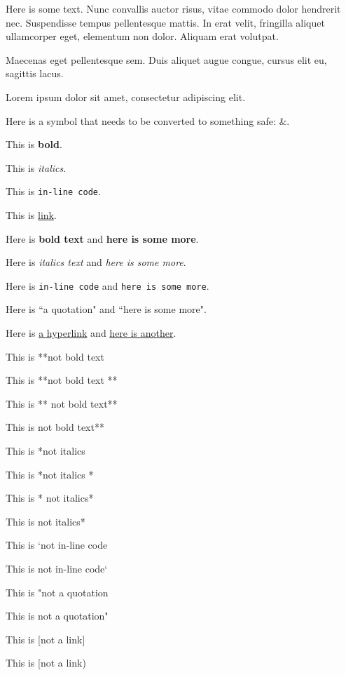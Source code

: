 \documentclass[10pt]{extarticle}
\date{}
\begin{document}

Here is some text. Nunc convallis auctor risus, vitae commodo dolor hendrerit nec. Suspendisse tempus pellentesque mattis. In erat velit, fringilla aliquet ullamcorper eget, elementum non dolor. Aliquam erat volutpat.

Maecenas eget pellentesque sem. Duis aliquet augue congue, cursus elit eu, sagittis lacus. 

Lorem ipsum dolor sit amet, consectetur adipiscing elit.

\medskip

Here is a symbol that needs to be converted to something safe: \&.

This is \textbf{bold}.

This is \textit{italics}.

This is \texttt{in-line code}.

This is \href{https://github.com}{link}.

Here is \textbf{bold text} and \textbf{here is some more}.

Here is \textit{italics text} and \textit{here is some more}.

Here is \texttt{in-line code} and \texttt{here is some more}.

Here is ``a quotation" and ``here is some more".

Here is \href{http://github.com}{a hyperlink} and \href{https://google.com}{here is another}.

This is **not bold text

This is **not bold text **

This is ** not bold text**

This is not bold text**

This is *not italics

This is *not italics *

This is * not italics*

This is not italics*

This is `not in-line code

This is not in-line code`

This is "not a quotation

This is not a quotation"

This is [not a link]

This is [not a link)

\end{document}
